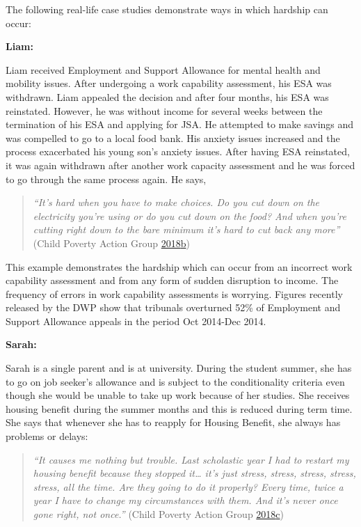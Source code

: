 \documentclass[]{tufte-handout}
\begin{document}
The following real-life case studies demonstrate ways in which hardship
can occur:

\textbf{Liam:}

Liam received Employment and Support Allowance for mental health and
mobility issues. After undergoing a work capability assessment, his ESA
was withdrawn. Liam appealed the decision and after four months, his ESA
was reinstated. However, he was without income for several weeks between
the termination of his ESA and applying for JSA. He attempted to make
savings and was compelled to go to a local food bank. His anxiety issues
increased and the process exacerbated his young son's anxiety issues.
After having ESA reinstated, it was again withdrawn after another work
capacity assessment and he was forced to go through the same process
again. He says,

\begin{quote}
\emph{``It's hard when you have to make choices. Do you cut down on the
electricity you're using or do you cut down on the food? And when you're
cutting right down to the bare minimum it's hard to cut back any more''}
(Child Poverty Action Group
\protect\hyperlink{ref-ChildPovertyActionGroupa}{2018}\protect\hyperlink{ref-ChildPovertyActionGroupa}{b})
\end{quote}

This example demonstrates the hardship which can occur from an incorrect
work capability assessment and from any form of sudden disruption to
income. The frequency of errors in work capability assessments is
worrying. Figures recently released by the DWP show that tribunals
overturned 52\% of Employment and Support Allowance appeals in the
period Oct 2014-Dec 2014.

\textbf{Sarah: }

Sarah is a single parent and is at university. During the student
summer, she has to go on job seeker's allowance and is subject to the
conditionality criteria even though she would be unable to take up work
because of her studies. She receives housing benefit during the summer
months and this is reduced during term time. She says that whenever she
has to reapply for Housing Benefit, she always has problems or delays:

\begin{quote}
\emph{``It causes me nothing but trouble. Last scholastic year I had to
restart my housing benefit because they stopped it\ldots{} it's just
stress, stress, stress, stress, stress, all the time. Are they going to
do it properly? Every time, twice a year I have to change my
circumstances with them. And it's never once gone right, not once.''}
(Child Poverty Action Group
\protect\hyperlink{ref-ChildPovertyActionGroup}{2018}\protect\hyperlink{ref-ChildPovertyActionGroup}{c})
\end{quote}
\end{document}
